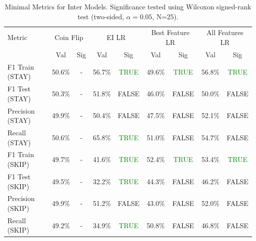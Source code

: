 \begin{table}[ht]
\centering
\begin{tabular}{lcccccccc}
\hline
Metric & \multicolumn{2}{c}{Coin Flip} & \multicolumn{2}{c}{EI LR} & \multicolumn{2}{c}{Best Feature LR} & \multicolumn{2}{c}{All Features LR} \\
 & Val & Sig & Val & Sig & Val & Sig & Val & Sig \\
\hline
F1 Train (STAY) & 50.6\% & - & 56.7\% & \textcolor{green}{TRUE} & 49.6\% & \textcolor{green}{TRUE} & 56.8\% & \textcolor{green}{TRUE} \\
F1 Test (STAY) & 50.3\% & - & 51.8\% & FALSE & 46.0\% & FALSE & 50.0\% & FALSE \\
Precision (STAY) & 49.9\% & - & 50.4\% & FALSE & 47.5\% & FALSE & 52.1\% & FALSE \\
Recall (STAY) & 50.6\% & - & 65.8\% & \textcolor{green}{TRUE} & 51.0\% & FALSE & 54.7\% & FALSE \\
F1 Train (SKIP) & 49.7\% & - & 41.6\% & \textcolor{green}{TRUE} & 52.4\% & \textcolor{green}{TRUE} & 53.4\% & \textcolor{green}{TRUE} \\
F1 Test (SKIP) & 49.5\% & - & 32.2\% & \textcolor{green}{TRUE} & 44.3\% & FALSE & 46.2\% & FALSE \\
Precision (SKIP) & 49.9\% & - & 51.2\% & FALSE & 43.0\% & FALSE & 52.0\% & FALSE \\
Recall (SKIP) & 49.2\% & - & 34.9\% & \textcolor{green}{TRUE} & 50.8\% & FALSE & 46.8\% & FALSE \\
\hline
\end{tabular}
\caption{Minimal Metrics for Inter Models. Significance tested using Wilcoxon signed-rank test (two-sided, $\alpha=0.05$, N=25).}
\label{tab:metrics_inter}
\end{table}